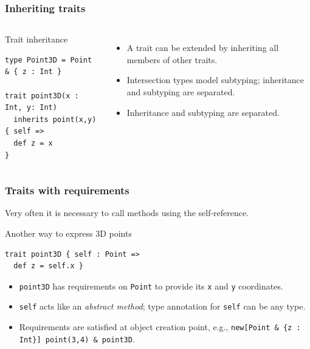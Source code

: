 \documentclass{beamer}
\begin{document}
\begin{frame}[fragile]
  \frametitle{Inheriting traits}

\begin{columns}[t]

\begin{exampleblock}{Trait inheritance}
\begin{lstlisting}
type Point3D = Point & { z : Int }

trait point3D(x : Int, y: Int)
  inherits point(x,y) { self =>
  def z = x
}
\end{lstlisting}

\end{exampleblock}




\begin{itemize}
\item A trait can be extended by inheriting all members of other traits.
\item Intersection types model subtyping; inheritance and subtyping are
  separated.
\item Inheritance and subtyping are separated.
\end{itemize}


\end{columns}


\end{frame}


\begin{frame}[fragile]
  \frametitle{Traits with requirements}

  Very often it is necessary to call methods using the self-reference.


  \begin{exampleblock}{Another way to express 3D points}
\begin{lstlisting}
trait point3D { self : Point =>
  def z = self.x }
\end{lstlisting}

  \end{exampleblock}

  \begin{itemize}
  \item \lstinline{point3D} has requirements on \lstinline{Point} to provide its
    \lstinline$x$ and \lstinline$y$ coordinates.
  \item \lstinline{self} acts like an \textit{abstract method}; type annotation
    for \lstinline{self} can be any type.
  \item Requirements are satisfied at object creation point, e.g., \lstinline$new[Point & {z : Int}] point(3,4) & point3D$.

  \end{itemize}


\end{frame}
\end{document}

